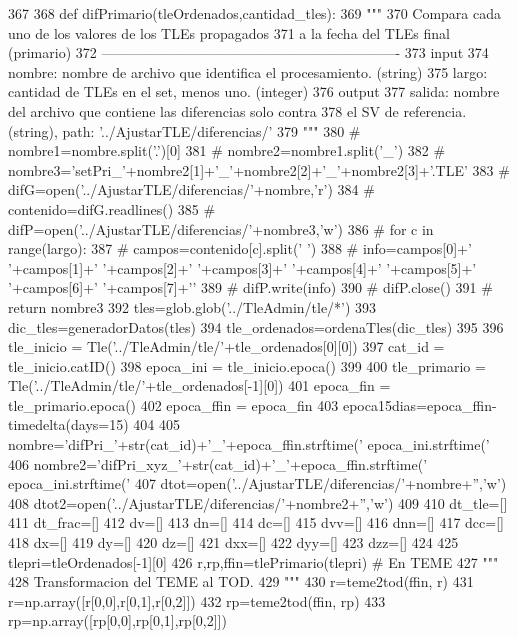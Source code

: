 \begin{DoxyCode}
367 
368 def difPrimario(tleOrdenados,cantidad_tles):
369     """
370     Compara cada uno de los valores de los TLEs propagados 
371     a la fecha del TLEs final (primario)
372     ----------------------------------------------------------------
373     input
374         nombre: nombre de archivo que identifica el procesamiento. (string)
375         largo: cantidad de TLEs en el set, menos  uno. (integer)
376     output
377         salida: nombre del archivo que contiene las diferencias solo contra 
378         el SV de referencia. (string), path: '../AjustarTLE/diferencias/'
379     """
380 #     nombre1=nombre.split('.')[0]
381 #     nombre2=nombre1.split('_')
382 #     nombre3='setPri_'+nombre2[1]+'_'+nombre2[2]+'_'+nombre2[3]+'.TLE'
383 #     difG=open('../AjustarTLE/diferencias/'+nombre,'r')
384 #     contenido=difG.readlines()
385 #     difP=open('../AjustarTLE/diferencias/'+nombre3,'w')
386 #     for c in range(largo):
387 #         campos=contenido[c].split(' ')
388 #         info=campos[0]+' '+campos[1]+' '+campos[2]+' '+campos[3]+'
       '+campos[4]+' '+campos[5]+' '+campos[6]+' '+campos[7]+'\n'
389 #         difP.write(info)
390 #     difP.close() 
391 #     return nombre3
392     tles=glob.glob('../TleAdmin/tle/*')
393     dic_tles=generadorDatos(tles)
394     tle_ordenados=ordenaTles(dic_tles)
395     
396     tle_inicio = Tle('../TleAdmin/tle/'+tle_ordenados[0][0])
397     cat_id = tle_inicio.catID()
398     epoca_ini = tle_inicio.epoca()
399     
400     tle_primario = Tle('../TleAdmin/tle/'+tle_ordenados[-1][0])
401     epoca_fin  = tle_primario.epoca()
402     epoca_ffin = epoca_fin
403     epoca15dias=epoca_ffin-timedelta(days=15)
404     
405     nombre='difPri_'+str(cat_id)+'_'+epoca_ffin.strftime('%
      epoca_ini.strftime('%
406     nombre2='difPri_xyz_'+str(cat_id)+'_'+epoca_ffin.strftime('%
      epoca_ini.strftime('%
407     dtot=open('../AjustarTLE/diferencias/'+nombre+'','w')
408     dtot2=open('../AjustarTLE/diferencias/'+nombre2+'','w')
409     
410     dt_tle=[]
411     dt_frac=[]
412     dv=[]
413     dn=[]
414     dc=[]
415     dvv=[]
416     dnn=[]
417     dcc=[]
418     dx=[]
419     dy=[]
420     dz=[]
421     dxx=[]
422     dyy=[]
423     dzz=[]
424 
425     tlepri=tleOrdenados[-1][0]
426     r,rp,ffin=tlePrimario(tlepri) # En TEME
427     """
428     Transformacion del TEME al TOD.
429     """ 
430     r=teme2tod(ffin, r)
431     r=np.array([r[0,0],r[0,1],r[0,2]])
432     rp=teme2tod(ffin, rp) 
433     rp=np.array([rp[0,0],rp[0,1],rp[0,2]])

\end{DoxyCode}
